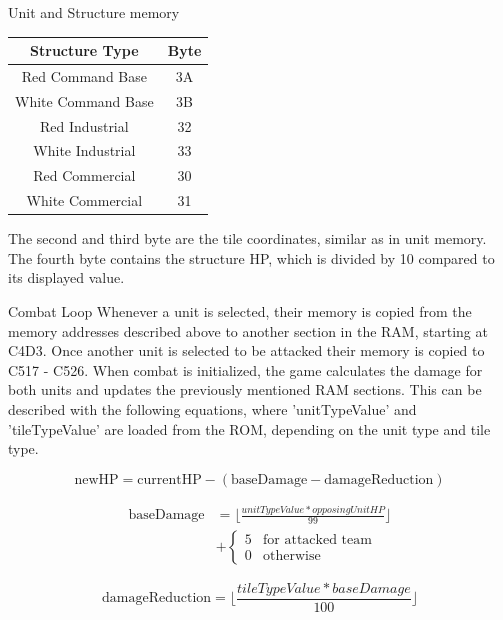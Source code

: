 \documentclass[final,dvipsnames]{beamer}
\newlength{\colwidth}
\begin{document}
\begin{frame}[t, fragile]
\begin{columns}[t]
\begin{column}{\colwidth}
\begin{block}{Unit and Structure memory}
	\begin{tabular}{|c|c|}
		\hline
		Structure Type & Byte \\
		\hline
		Red Command Base & 3A \\
		\hline
		White Command Base & 3B \\
		\hline
		Red Industrial & 32 \\
		\hline
		White Industrial & 33 \\
		\hline
		Red Commercial & 30 \\
		\hline
		White Commercial & 31 \\
		\hline
	\end{tabular}
	
	The second and third byte are the tile coordinates, similar as in unit memory. The fourth byte contains the structure HP, which is divided by 10 compared to its displayed value.

	\end{block}
	\begin{block}{Combat Loop}
		Whenever a unit is selected, their memory is copied from the memory addresses described above to another section in the RAM, starting at C4D3. Once another unit is selected to be attacked their memory is copied to C517 - C526.
		When combat is initialized, the game calculates the damage for both units and updates the previously mentioned RAM sections. This can be described with the following equations, where 'unitTypeValue' and 'tileTypeValue' are loaded from the ROM, depending on the unit type and tile type.
		
		\begin{equation}
			\text{newHP} = \text{currentHP} - (\text{baseDamage} -\text{damageReduction})
		\end{equation}
		
		\begin{equation}
			\begin{aligned}
			\text{baseDamage} &=\lfloor\frac{unitTypeValue * opposingUnitHP}{99}\rfloor \\
			&+ \begin{cases} 5 & \text{for attacked team} \\ 0 & \text{otherwise} \end{cases}
			\end{aligned}
		\end{equation}
	
		\begin{equation}
			\text{damageReduction} =\lfloor\frac{tileTypeValue * baseDamage}{100}\rfloor
		\end{equation}
		

\end{block}
\end{column}
\end{columns}
\end{frame}
\end{document}
